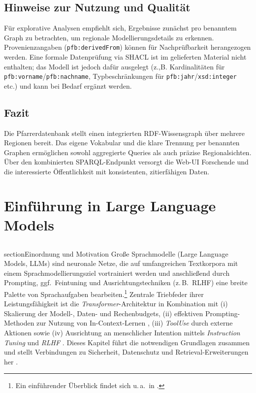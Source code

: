 \subsection{Hinweise zur Nutzung und Qualität}
Für explorative Analysen empfiehlt sich, Ergebnisse zunächst pro benanntem Graph zu betrachten, um regionale Modellierungsdetails zu erkennen. Provenienzangaben (\texttt{pfb:derivedFrom}) können für Nachprüfbarkeit herangezogen werden. Eine formale Datenprüfung via SHACL ist im gelieferten Material nicht enthalten; das Modell ist jedoch dafür ausgelegt (z.,B. Kardinalitäten für \texttt{pfb:vorname}/\texttt{pfb:nachname}, Typbeschränkungen für \texttt{pfb:jahr}/\texttt{xsd:integer} etc.) und kann bei Bedarf ergänzt werden.

\subsection{Fazit}
Die Pfarrerdatenbank stellt einen integrierten RDF-Wissensgraph über mehrere Regionen bereit. Das eigene Vokabular und die klare Trennung per benannten Graphen ermöglichen sowohl aggregierte Queries als auch präzise Regionalsichten. Über den kombinierten SPARQL-Endpunkt versorgt die Web-UI Forschende und die interessierte Öffentlichkeit mit konsistenten, zitierfähigen Daten.








\section{Einführung in Large Language Models}
\label{Einfuehrung in Large-Language-Models}

\subsection{}section{Einordnung und Motivation}
Große Sprachmodelle (Large Language Models, LLMs) sind neuronale Netze, die auf umfangreichen Textkorpora mit einem Sprachmodellierungsziel vortrainiert werden und anschließend durch Prompting, ggf.\ Feintuning und Ausrichtungstechniken (z.\,B.\ RLHF) eine breite Palette von Sprachaufgaben bearbeiten.\footnote{Ein einführender Überblick findet sich u.\,a.\ in \cite{campesatoLLMIntro}.} 
Zentrale Triebfeder ihrer Leistungsfähigkeit ist die \emph{Transformer}-Architektur \cite{vaswani2017attention} in Kombination mit (i) Skalierung der Modell-, Daten- und Rechenbudgets, (ii) effektiven Prompting-Methoden zur Nutzung von In-Context-Lernen \cite{brown2020language,wei2022chain}, (iii) \emph{Tool\-Use} durch externe Aktionen \cite{yao2023react} sowie (iv) Ausrichtung an menschlicher Intention mittels \emph{Instruction Tuning} und \emph{RLHF} \cite{ouyang2022training}. 
Dieses Kapitel führt die notwendigen Grundlagen zusammen und stellt Verbindungen zu Sicherheit, Datenschutz und Retrieval-Erweiterungen her \cite{abadi2016deep,carlini2021extracting,lewis2020rag}. 

